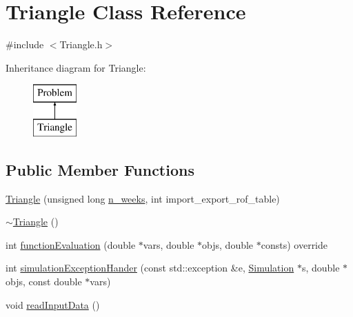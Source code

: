 \hypertarget{classTriangle}{}\section{Triangle Class Reference}
\label{classTriangle}


{\ttfamily \#include $<$Triangle.\+h$>$}

Inheritance diagram for Triangle\+:\begin{figure}[H]
\begin{center}
\leavevmode
\includegraphics[height=2.000000cm]{classTriangle}
\end{center}
\end{figure}
\subsection*{Public Member Functions}
\begin{DoxyCompactItemize}
\item 
\mbox{\hyperlink{classTriangle_a24833bad242ddc3f671b36678dff5738_a24833bad242ddc3f671b36678dff5738}{Triangle}} (unsigned long \mbox{\hyperlink{classProblem_ac7513bb0ecdfa4bbb7d2ada3595d71ec_ac7513bb0ecdfa4bbb7d2ada3595d71ec}{n\+\_\+weeks}}, int import\+\_\+export\+\_\+rof\+\_\+table)
\item 
\mbox{\hyperlink{classTriangle_a5199760a17454f4dc94c855a57e3a152_a5199760a17454f4dc94c855a57e3a152}{$\sim$\+Triangle}} ()
\item 
int \mbox{\hyperlink{classTriangle_a9e95039d098fd61cce1a830b85ed7004_a9e95039d098fd61cce1a830b85ed7004}{function\+Evaluation}} (double $\ast$vars, double $\ast$objs, double $\ast$consts) override
\item 
int \mbox{\hyperlink{classTriangle_a816ff476231f6bd575c82978706f4b9a_a816ff476231f6bd575c82978706f4b9a}{simulation\+Exception\+Hander}} (const std\+::exception \&e, \mbox{\hyperlink{classSimulation}{Simulation}} $\ast$s, double $\ast$objs, const double $\ast$vars)
\item 
void \mbox{\hyperlink{classTriangle_a045e3263a62a8a628fe5645f0323b7e4_a045e3263a62a8a628fe5645f0323b7e4}{read\+Input\+Data}} ()
\end{DoxyCompactItemize}
